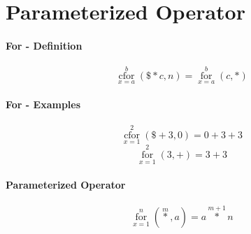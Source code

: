 \documentclass{article}
\begin{document}
\section{Parameterized Operator}
\paragraph{For - Definition}

\[ \operatorname*{cfor}_{x=a}^{b}\left(\$\ast c,n\right) = \operatorname*{for}_{x=a}^{b}\left(c,\ast \right) \]

\paragraph{For - Examples}

\[ \operatorname*{cfor}_{x=1}^{2}\left(\$+3,0\right) = 0+3+3 \]
\[ \operatorname*{for}_{x=1}^{2}\left(3,+\right) = 3+3 \]

\paragraph{Parameterized Operator}
\[ \operatorname*{for}_{x=1}^{n}\left(\operatorname*{\ast}^m,a\right) = a\operatorname*{\ast}^{m+1}n\]
\end{document}
